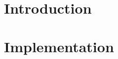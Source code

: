 \documentclass[hidelinks]{report}
\begin{document}

\tableofcontents


\chapter{Introduction}
%




 


 



 



 
%


 
%




\appendix



\appendix
\chapter{Implementation}
\label{appendix:implementation}
%





\end{document}
